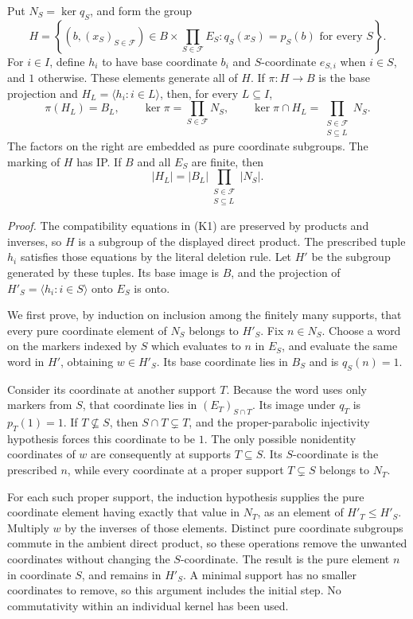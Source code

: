 Put \(N_S=\ker q_S\), and form the group \[
H=\left\{(b,(x_S)_{S\in\mathcal F})\in
B\times\prod_{S\in\mathcal F}E_S:
q_S(x_S)=p_S(b)\text{ for every }S\right\}.
\tag{K1}
\] For \(i\in I\), define \(h_i\) to have base coordinate \(b_i\) and
\(S\)-coordinate \(e_{S,i}\) when \(i\in S\), and \(1\) otherwise. These
elements generate all of \(H\). If \(\pi:H\to B\) is the base projection
and \(H_L=\langle h_i:i\in L\rangle\), then, for every \(L\subseteq I\),
\[
\pi(H_L)=B_L,\qquad
\ker\pi=\prod_{S\in\mathcal F}N_S,\qquad
\ker\pi\cap H_L=\prod_{\substack{S\in\mathcal F\\S\subseteq L}}N_S.
\tag{K2}
\] The factors on the right are embedded as pure coordinate subgroups.
The marking of \(H\) has IP. If \(B\) and all \(E_S\) are finite, then
\[
|H_L|=|B_L|\prod_{\substack{S\in\mathcal F\\S\subseteq L}}|N_S|.
\tag{K3}
\]

\emph{Proof.} The compatibility equations in (K1) are preserved by
products and inverses, so \(H\) is a subgroup of the displayed direct
product. The prescribed tuple \(h_i\) satisfies those equations by the
literal deletion rule. Let \(H'\) be the subgroup generated by these
tuples. Its base image is \(B\), and the projection of
\(H'_S=\langle h_i:i\in S\rangle\) onto \(E_S\) is onto.

We first prove, by induction on inclusion among the finitely many
supports, that every pure coordinate element of \(N_S\) belongs to
\(H'_S\). Fix \(n\in N_S\). Choose a word on the markers indexed by
\(S\) which evaluates to \(n\) in \(E_S\), and evaluate the same word in
\(H'\), obtaining \(w\in H'_S\). Its base coordinate lies in \(B_S\) and
is \(q_S(n)=1\).

Consider its coordinate at another support \(T\). Because the word uses
only markers from \(S\), that coordinate lies in \((E_T)_{S\cap T}\).
Its image under \(q_T\) is \(p_T(1)=1\). If \(T\not\subseteq S\), then
\(S\cap T\subsetneq T\), and the proper-parabolic injectivity hypothesis
forces this coordinate to be \(1\). The only possible nonidentity
coordinates of \(w\) are consequently at supports \(T\subseteq S\). Its
\(S\)-coordinate is the prescribed \(n\), while every coordinate at a
proper support \(T\subsetneq S\) belongs to \(N_T\).

For each such proper support, the induction hypothesis supplies the pure
coordinate element having exactly that value in \(N_T\), as an element
of \(H'_T\leq H'_S\). Multiply \(w\) by the inverses of those elements.
Distinct pure coordinate subgroups commute in the ambient direct
product, so these operations remove the unwanted coordinates without
changing the \(S\)-coordinate. The result is the pure element \(n\) in
coordinate \(S\), and remains in \(H'_S\). A minimal support has no
smaller coordinates to remove, so this argument includes the initial
step. No commutativity within an individual kernel has been used.

